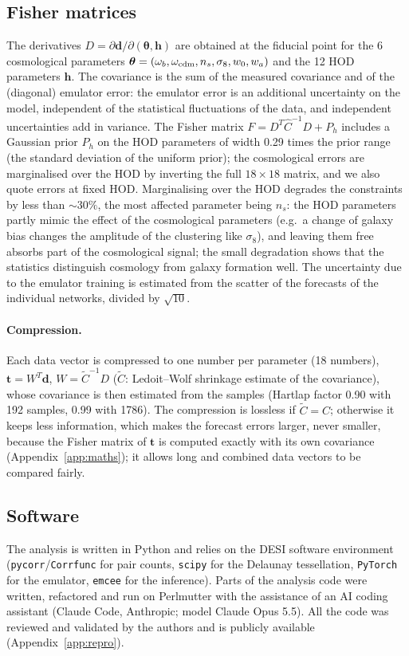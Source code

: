 \subsection{Fisher matrices}
\label{sec:fishermat}

The derivatives $D=\partial\boldsymbol d/\partial(\boldsymbol\theta,\boldsymbol h)$ are obtained at the fiducial point for the 6 cosmological parameters $\boldsymbol\theta=(\omega_b,\omega_{\rm cdm},n_s,\sigma_8,w_0,w_a)$ and the 12 HOD parameters $\boldsymbol h$. The covariance is the sum of the measured covariance and of the (diagonal) emulator error: the emulator error is an additional uncertainty on the model, independent of the statistical fluctuations of the data, and independent uncertainties add in variance. The Fisher matrix $F = D^T\hat C^{-1}D + P_h$ includes a Gaussian prior $P_h$ on the HOD parameters of width 0.29 times the prior range (the standard deviation of the uniform prior); the cosmological errors are marginalised over the HOD by inverting the full $18\times18$ matrix, and we also quote errors at fixed HOD. Marginalising over the HOD degrades the constraints by less than $\sim30\%$, the most affected parameter being $n_s$: the HOD parameters partly mimic the effect of the cosmological parameters (e.g.\ a change of galaxy bias changes the amplitude of the clustering like $\sigma_8$), and leaving them free absorbs part of the cosmological signal; the small degradation shows that the statistics distinguish cosmology from galaxy formation well. The uncertainty due to the emulator training is estimated from the scatter of the forecasts of the individual networks, divided by $\sqrt{10}$.

\paragraph{Compression.} Each data vector is compressed to one number per parameter (18 numbers), $\boldsymbol t=W^T\boldsymbol d$, $W=\tilde C^{-1}D$ ($\tilde C$: Ledoit--Wolf shrinkage estimate of the covariance), whose covariance is then estimated from the samples (Hartlap factor 0.90 with 192 samples, 0.99 with 1786). The compression is lossless if $\tilde C=C$; otherwise it keeps less information, which makes the forecast errors larger, never smaller, because the Fisher matrix of $\boldsymbol t$ is computed exactly with its own covariance (Appendix~\ref{app:maths}); it allows long and combined data vectors to be compared fairly.

\subsection{Software}
\label{sec:ai}

The analysis is written in Python and relies on the DESI software environment (\texttt{pycorr}/\texttt{Corrfunc} for pair counts, \texttt{scipy} for the Delaunay tessellation, \texttt{PyTorch} for the emulator, \texttt{emcee} for the inference). Parts of the analysis code were written, refactored and run on Perlmutter with the assistance of an AI coding assistant (Claude Code, Anthropic; model Claude Opus 5.5). All the code was reviewed and validated by the authors and is publicly available (Appendix~\ref{app:repro}).
